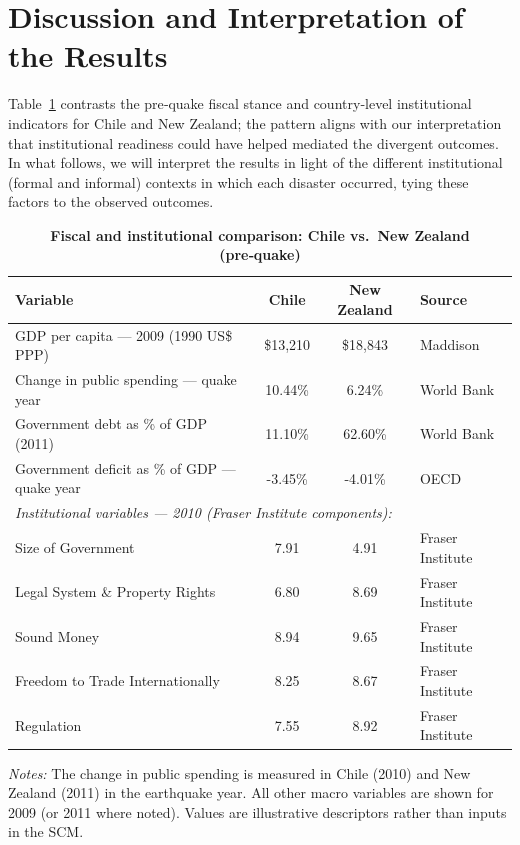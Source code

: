 \documentclass[12pt]{article}
\begin{document}
\section{Discussion and Interpretation of the Results}

Table~\ref{tab:fiscal_inst} contrasts the pre‑quake fiscal stance and country‑level institutional indicators for Chile and New Zealand; the pattern aligns with our interpretation that institutional readiness could have helped mediated the divergent outcomes. In what follows, we will interpret the results in light of the different institutional (formal and informal) contexts in which each disaster occurred, tying these factors to the observed outcomes. 

\begin{table}[H]
\centering
\caption{\textbf{Fiscal and institutional comparison: Chile vs.\ New Zealand (pre‑quake)}}
\label{tab:fiscal_inst}
\small
\setlength{\tabcolsep}{6pt}
\begin{threeparttable}
\begin{tabular}{lcc l}
\toprule
\textbf{Variable} & \textbf{Chile} & \textbf{New Zealand} & \textbf{Source} \\
\midrule
GDP per capita — 2009 (1990 US\$ PPP) & \$13{,}210 & \$18{,}843 & Maddison \\
Change in public spending — quake year & 10.44\% & 6.24\% & World Bank \\
Government debt as \% of GDP (2011) & 11.10\% & 62.60\% & World Bank \\
Government deficit as \% of GDP — quake year & -3.45\% & -4.01\% & OECD \\
\midrule
\multicolumn{4}{l}{\textit{Institutional variables — 2010 (Fraser Institute components):}} \\
Size of Government & 7.91 & 4.91 & Fraser Institute \\
Legal System \& Property Rights & 6.80 & 8.69 & Fraser Institute \\
Sound Money & 8.94 & 9.65 & Fraser Institute \\
Freedom to Trade Internationally & 8.25 & 8.67 & Fraser Institute \\
Regulation & 7.55 & 8.92 & Fraser Institute \\
\bottomrule
\end{tabular}
\begin{tablenotes}[flushleft]\footnotesize
\item \textit{Notes:} The change in public spending is measured in Chile (2010) and New Zealand (2011) in the earthquake year. All other macro variables are shown for 2009 (or 2011 where noted). Values are illustrative descriptors rather than inputs in the SCM.
\end{tablenotes}
\end{threeparttable}
\end{table}
\end{document}
